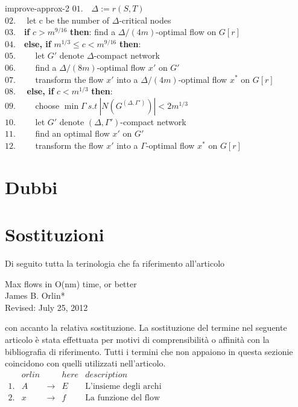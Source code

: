 \documentclass[a4paper, 11pt]{report}
\begin{document}
\newpage
\begin{algo}{improve-approx-2}{}
    $01.\quad \Delta := r(S,T)$\\
    $02.\quad$ let c be the number of $\Delta$-critical nodes\\
    $03.\quad$\textbf{if} $c>m^{9/16}$ \textbf{then}: find a $\Delta/(4m)$-optimal flow on $G[r]$\\
    $04.\quad$\textbf{else, if} $m^{1/3}\le c<m^{9/16}$ \textbf{then}:\\
    $05.\qquad$ let $G'$ denote $\Delta$-compact network\\
    $06.\qquad$ find a $\Delta/(8m)$-optimal flow $x'$ on $G'$\\
    $07.\qquad$ transform the flow $x'$ into a $\Delta/(4m)$-optimal flow $x^*$ on $G[r]$\\
    $08.\quad$ \textbf{else, if} $c < m^{1/3}$ \textbf{then}: \\
    $09.\qquad$ choose  $\min \Gamma\ s.t\  |N(G^{(\Delta, \Gamma')})| < 2m^{1/3}$\\
    $10.\qquad$ let $G'$ denote $(\Delta, \Gamma')$-compact network\\
    $11.\qquad$ find an optimal flow $x'$ on $G'$\\
    $12.\qquad$ transform the flow $x'$ into a $\Gamma$-optimal flow $x^*$ on $G[r]$\\

            
    
    
\end{algo}


\newpage
\section{Dubbi}
    
\section{Sostituzioni}
Di seguito tutta la terinologia che fa riferimento all'articolo
\begin{center}
    Max flows in O(nm) time, or better\\
    James B. Orlin*\\
    Revised: July 25, 2012\\
\end{center}
con accanto la relativa sostituzione. La sostituzione del termine nel seguente articolo è stata effettuata per 
motivi di comprensibilità o affinità con la bibliografia di riferimento. Tutti i termini che non appaiono in questa
 sezionie coincidono con quelli utilizzati nell'articolo.\\
$\begin{array}{lcccl}
      &orlin&          &here& description\\\hline
    1.& A & \rightarrow &E& \text{L'insieme degli archi}\\
    2.& x & \rightarrow &f& \text{La funzione del flow}
\end{array}$
\end{document}
